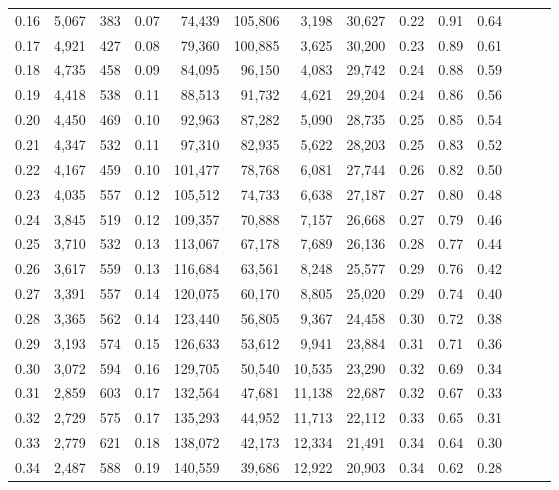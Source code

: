 \begin{tabular}{rrrrrrrrrrrrrr}
0.16 &  5,067 &  383 &  0.07 &   74,439 &  105,806 &   3,198 &  30,627 &  0.22 &  0.91 &      0.64 \\
0.17 &  4,921 &  427 &  0.08 &   79,360 &  100,885 &   3,625 &  30,200 &  0.23 &  0.89 &      0.61 \\
0.18 &  4,735 &  458 &  0.09 &   84,095 &   96,150 &   4,083 &  29,742 &  0.24 &  0.88 &      0.59 \\
0.19 &  4,418 &  538 &  0.11 &   88,513 &   91,732 &   4,621 &  29,204 &  0.24 &  0.86 &      0.56 \\
0.20 &  4,450 &  469 &  0.10 &   92,963 &   87,282 &   5,090 &  28,735 &  0.25 &  0.85 &      0.54 \\
0.21 &  4,347 &  532 &  0.11 &   97,310 &   82,935 &   5,622 &  28,203 &  0.25 &  0.83 &      0.52 \\
0.22 &  4,167 &  459 &  0.10 &  101,477 &   78,768 &   6,081 &  27,744 &  0.26 &  0.82 &      0.50 \\
0.23 &  4,035 &  557 &  0.12 &  105,512 &   74,733 &   6,638 &  27,187 &  0.27 &  0.80 &      0.48 \\
0.24 &  3,845 &  519 &  0.12 &  109,357 &   70,888 &   7,157 &  26,668 &  0.27 &  0.79 &      0.46 \\
0.25 &  3,710 &  532 &  0.13 &  113,067 &   67,178 &   7,689 &  26,136 &  0.28 &  0.77 &      0.44 \\
0.26 &  3,617 &  559 &  0.13 &  116,684 &   63,561 &   8,248 &  25,577 &  0.29 &  0.76 &      0.42 \\
0.27 &  3,391 &  557 &  0.14 &  120,075 &   60,170 &   8,805 &  25,020 &  0.29 &  0.74 &      0.40 \\
0.28 &  3,365 &  562 &  0.14 &  123,440 &   56,805 &   9,367 &  24,458 &  0.30 &  0.72 &      0.38 \\
0.29 &  3,193 &  574 &  0.15 &  126,633 &   53,612 &   9,941 &  23,884 &  0.31 &  0.71 &      0.36 \\
0.30 &  3,072 &  594 &  0.16 &  129,705 &   50,540 &  10,535 &  23,290 &  0.32 &  0.69 &      0.34 \\
0.31 &  2,859 &  603 &  0.17 &  132,564 &   47,681 &  11,138 &  22,687 &  0.32 &  0.67 &      0.33 \\
0.32 &  2,729 &  575 &  0.17 &  135,293 &   44,952 &  11,713 &  22,112 &  0.33 &  0.65 &      0.31 \\
0.33 &  2,779 &  621 &  0.18 &  138,072 &   42,173 &  12,334 &  21,491 &  0.34 &  0.64 &      0.30 \\
0.34 &  2,487 &  588 &  0.19 &  140,559 &   39,686 &  12,922 &  20,903 &  0.34 &  0.62 &      0.28 \\

\end{tabular}
